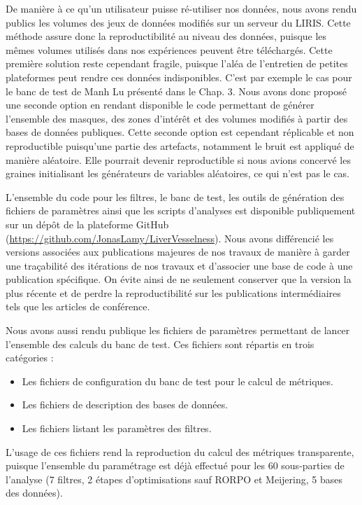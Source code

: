 De manière à ce qu'un utilisateur puisse ré-utiliser nos données, nous avons rendu publics les volumes des jeux de données modifiés sur un serveur du LIRIS. Cette méthode assure donc la reproductibilité au niveau des données, puisque les mêmes volumes utilisés dans nos expériences peuvent être téléchargés. Cette première solution reste cependant fragile, puisque l'aléa de l'entretien de petites plateformes peut rendre ces données indisponibles. C'est par exemple le cas pour le banc de test de Manh Lu présenté dans le Chap. 3. Nous avons donc proposé une seconde option en rendant disponible le code permettant de générer l'ensemble des masques, des zones d'intérêt et des volumes modifiés à partir des bases de données publiques. Cette seconde option est cependant réplicable et non reproductible puisqu'une partie des artefacts, notamment le bruit est appliqué de manière aléatoire. Elle pourrait devenir reproductible si nous avions concervé les graines initialisant les générateurs de variables aléatoires, ce qui n'est pas le cas.  

L'ensemble du code pour les filtres, le banc de test, les outils de génération des fichiers de paramètres ainsi que les scripts d'analyses est disponible publiquement sur un dépôt de la plateforme GitHub (\url{https://github.com/JonasLamy/LiverVesselness}). Nous avons différencié les versions associées aux publications majeures de nos travaux de manière à garder une traçabilité des itérations de nos travaux et d'associer une base de code à une publication spécifique. On évite ainsi de ne seulement conserver que la version la plus récente et de perdre la reproductibilité sur les publications intermédiaires tels que les articles de conférence.

Nous avons aussi rendu publique les fichiers de paramètres permettant de lancer l'ensemble des calculs du banc de test. Ces fichiers sont répartis en trois catégories : 

\begin{itemize}
\item Les fichiers de configuration du banc de test pour le calcul de métriques.
\item Les fichiers de description des bases de données.
\item Les fichiers listant les paramètres des filtres.  
\end{itemize}

L'usage de ces fichiers rend la reproduction du calcul des métriques transparente, puisque l'ensemble du paramétrage est déjà effectué pour les 60 sous-parties de l'analyse (7 filtres, 2 étapes d'optimisations sauf RORPO et Meijering, 5 bases des données).


